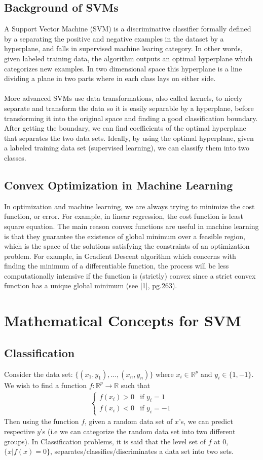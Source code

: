 \documentclass[11pt, a4paper]{article}
\begin{document}
\subsection{Background of SVMs}
A Support Vector Machine (SVM) is a discriminative classifier formally defined by a separating the positive and negative examples in the dataset by a hyperplane, and falls in supervised machine learing category. In other words, given labeled training data, the algorithm outputs an optimal hyperplane which categorizes new examples. In two dimensional space this hyperplane is a line dividing a plane in two parts where in each class lays on either side.\\ \\
More advanced SVMs use data transformations, also called kernels, to nicely separate and transform the data so it is easily separable by a hyperplane, before transforming it into the original space and finding a good classification boundary. After getting the boundary, we can find coefficients of the optimal hyperplane that separates the two data sets. Ideally, by using the optimal hyperplane, given a labeled training data set (supervised learning), we can classify them into two classes.
\subsection{Convex Optimization in Machine Learning}
In optimization and machine learning, we are always trying to minimize the cost function, or error. For example, in linear regression, the cost function is least square equation. The main reason convex functions are useful in machine learning is that they guarantee the existence of global minimum over a feasible region, which is the space of the solutions satisfying the constraints of an optimization problem. For example, in Gradient Descent algorithm which concerns with finding the minimum of a differentiable function, the process will be less computationally intensive if the function is (strictly) convex since a strict convex function has a unique global minimum (see [1], pg.263).
\section{Mathematical Concepts for SVM}
\subsection{Classification}
Consider the data set: $\{(x_1,y_1),\ldots,(x_n,y_n)\}$ where $x_i \in \mathbb{R}^p$ and $y_i \in \{1,-1\}$. We wish to find a function $f:\mathbb{R}^p\to \mathbb{R}$ such that
\begin{align}
\begin{cases}
f(x_i) > 0&\text{if }y_i = 1\\
f(x_i) <0&\text{if }y_i = -1
\end{cases}
\end{align}
Then using the function $f$, given a random data set of $x$'s, we can predict respective $y$'s (i.e we can categorize the random data set into two different groups). In Classification problems, it is said that the level set of $f$ at 0, $\{x|f(x) = 0\}$,  separates/classifies/discriminates a data set into two sets.
\end{document}
